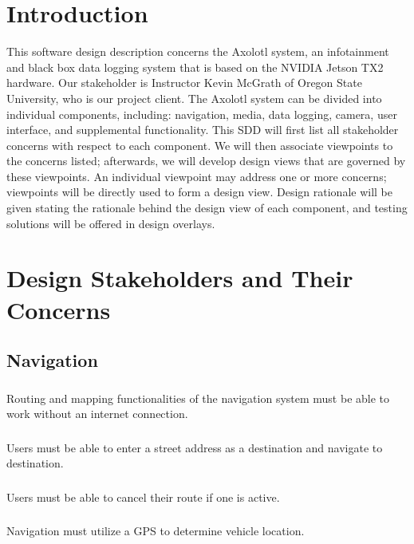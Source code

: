 \documentclass[onecolumn, draftclsnofoot,10pt, compsoc]{IEEEtran}
\begin{document}
\section{Introduction}
This software design description concerns the Axolotl system, an infotainment and black box data logging system that is based on the NVIDIA Jetson TX2 hardware. Our stakeholder is Instructor Kevin McGrath of Oregon State University, who is our project client. The Axolotl system can be divided into individual components, including: navigation, media, data logging, camera, user interface, and supplemental functionality. This SDD will first list all stakeholder concerns with respect to each component. We will then associate viewpoints to the concerns listed; afterwards, we will develop design views that are governed by these viewpoints. An individual viewpoint may address one or more concerns; viewpoints will be directly used to form a design view. Design rationale will be given stating the rationale behind the design view of each component, and testing solutions will be offered in design overlays.

\section{Design Stakeholders and Their Concerns}
\subsection{Navigation}
\subsubsection{}
Routing and mapping functionalities of the navigation system must be able to work without an internet connection.
\subsubsection{}
Users must be able to enter a street address as a destination and navigate to destination.
\subsubsection{}
Users must be able to cancel their route if one is active.
\subsubsection{}
Navigation must utilize a GPS to determine vehicle location.
\end{document}
